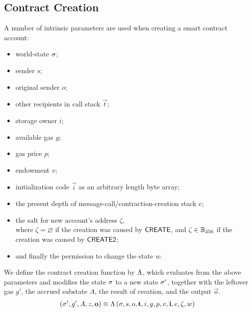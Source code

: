 

\subsection{Contract Creation}
\label{sec:creation}

A number of intrinsic parameters are used when creating a smart contract account:
\begin{itemize}[nosep]
	\item world-state ${\mathbf{\sigma}}$;
	
	\item sender $s$;

	\item original sender $o$;
	
	\item other recipients in call stack $\vec{t}$;
	
	\item storage owner $i$;
		
	\item available gas $g$;


	\item gas price $p$;

	\item endowment $v$;

	\item initialization code $\vec{i}$ as an arbitrary length byte array;

	\item the present depth of message-call/contraction-creation stack $e$;

	\item the salt for new account's address $\zeta$,\\
	where $\zeta = \varnothing$ if the creation was caused by {\hyperlink{create}{$\mathsf{CREATE}$}}, 
	and $\zeta\in \mathbb{B}_{256}$ if the creation was caused by {\hyperlink{create2}{$\mathsf{CREATE2}$}};

	\item and finally the permission to change the state $w$.
\end{itemize}


We define the contract creation function by $\mathrm{\Lambda}$,
which evaluates from the above parameters and modifies the state $\mathbf{\sigma}$ to a new state $\mathbf{\sigma}'$, together with the leftover gas $g'$, the accrued substate $A$, the result of creation, and the output $\vec{o}$. 
\begin{align}
	\left(\mathbf{\sigma}',g', A, z, \mathbf{o} \right)\equiv \mathrm{\Lambda}\left(\mathbf{\sigma}, s, o, \mathbf{t},i, g, p, v, \mathbf{i}, e, \zeta,w \right)
\end{align}


